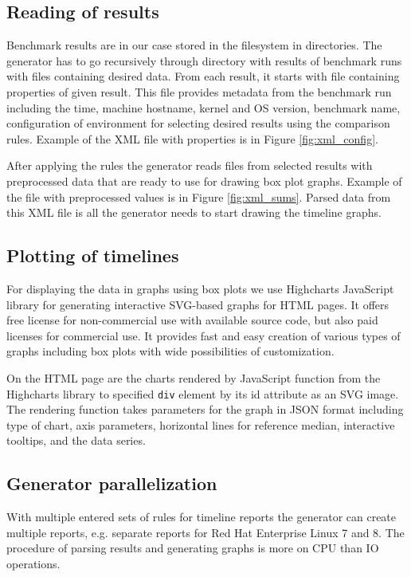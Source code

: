 \subsection{Reading of results}
Benchmark results are in our case stored in the filesystem in directories. The
generator has to go recursively through directory with results of benchmark runs
with files containing desired data. From each result, it starts with file
containing properties of given result. This file provides metadata from the
benchmark run including the time, machine hostname, kernel and OS version,
benchmark name, configuration of environment for selecting desired results using
the comparison rules. Example of the XML file with properties is in Figure
\ref{fig:xml_config}.

After applying the rules the generator reads files from
selected results with preprocessed data that are ready to use for drawing box
plot graphs. Example of the file with preprocessed values is in Figure
\ref{fig:xml_sums}. Parsed data from this XML file is all the generator needs to
start drawing the timeline graphs.

\subsection{Plotting of timelines}
For displaying the data in graphs using box plots we use Highcharts
JavaScript library\;\cite{highcharts} for generating interactive SVG-based
graphs for HTML pages. It offers free license for non-commercial use with
available source code, but also paid licenses for commercial use. It provides
fast and easy creation of various types of graphs including box plots with wide
possibilities of customization.

On the HTML page are the charts rendered by JavaScript function from the
Highcharts library to specified \texttt{div} element by its id attribute as an
SVG image. The rendering function takes parameters for the graph in JSON format
including type of chart, axis parameters, horizontal lines for reference median,
interactive tooltips, and the data series.

\subsection{Generator parallelization}
With multiple entered sets of rules for timeline reports the generator can
create multiple reports, e.g. separate reports for Red Hat Enterprise Linux 7
and 8. The procedure of parsing results and generating graphs is more on CPU
than IO operations.

